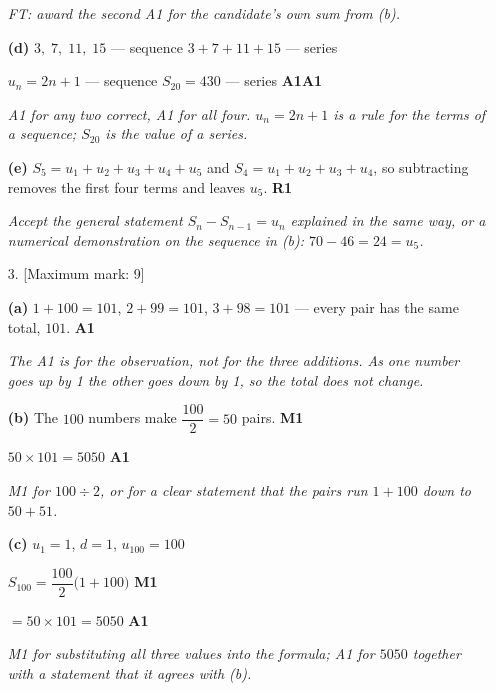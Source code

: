\documentclass[12pt, twoside]{article}
\begin{document}
\begin{enumerate}[itemsep=0.3cm]
\emph{FT: award the second A1 for the candidate's own sum from (b).}

\medskip

\textbf{(d)} $3,\; 7,\; 11,\; 15$ --- sequence \qquad
$3 + 7 + 11 + 15$ --- series

$u_{n} = 2n + 1$ --- sequence \qquad $S_{20} = 430$ --- series
\hfill \textbf{A1A1}

\emph{A1 for any two correct, A1 for all four. $u_{n} = 2n + 1$ is a rule for
the terms of a sequence; $S_{20}$ is the value of a series.}

\medskip

\textbf{(e)} $S_{5} = u_{1} + u_{2} + u_{3} + u_{4} + u_{5}$ and
$S_{4} = u_{1} + u_{2} + u_{3} + u_{4}$, so subtracting removes the first
four terms and leaves $u_{5}$. \hfill \textbf{R1}

\emph{Accept the general statement $S_{n} - S_{n-1} = u_{n}$ explained in the
same way, or a numerical demonstration on the sequence in (b):
$70 - 46 = 24 = u_{5}$.}

\newpage

\item[3.] [Maximum mark: 9]

\medskip

\textbf{(a)} $1 + 100 = 101$, \quad $2 + 99 = 101$, \quad $3 + 98 = 101$
--- every pair has the same total, $101$. \hfill \textbf{A1}

\emph{The A1 is for the observation, not for the three additions. As one
number goes up by 1 the other goes down by 1, so the total does not change.}

\medskip

\textbf{(b)} The $100$ numbers make $\dfrac{100}{2} = 50$ pairs.
\hfill \textbf{M1}

$50 \times 101 = 5050$ \hfill \textbf{A1}

\emph{M1 for $100 \div 2$, or for a clear statement that the pairs run
$1 + 100$ down to $50 + 51$.}

\medskip

\textbf{(c)} $u_{1} = 1$, \quad $d = 1$, \quad $u_{100} = 100$

$S_{100} = \dfrac{100}{2}\bigl(1 + 100\bigr)$ \hfill \textbf{M1}

$= 50 \times 101 = 5050$ \hfill \textbf{A1}

\emph{M1 for substituting all three values into the formula; A1 for $5050$
together with a statement that it agrees with (b).}


\end{enumerate}
\end{document}
